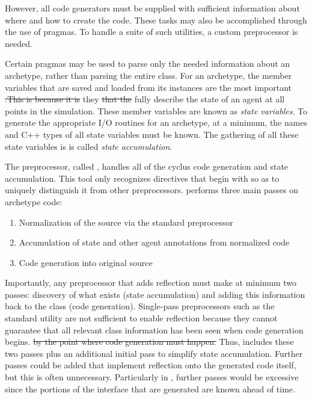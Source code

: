 However, all code generators must be supplied with sufficient information about
where and how to create the code. These tasks may also be accomplished through 
the use of pragmas. To handle a suite of such utilities, a custom preprocessor
is needed.

Certain pragmas may be used to parse only the needed information 
about an archetype, rather than parsing the entire class. For an archetype, the 
member variables that are saved and loaded from its instances are the most important \sout{.This is because it is}  they \sout{that the} fully describe the state of an agent 
at all points in the simulation. These member variables are known as \emph{state variables}. 
To generate the appropriate I/O routines for an archetype, at a minimum, the names and C++ types 
of all state variables must be known. The gathering  of all these state variables is is 
called \emph{state accumulation}. 


The \cyclus preprocessor, called \cycpp, handles all of the cyclus code generation
and state accumulation. This tool only recognizes directives that begin with  so as to uniquely distinguish it from other preprocessors.
\cycpp performs three main passes on archetype code:
\begin{enumerate}
    \item Normalization of the source via the standard preprocessor  
    \item Accumulation of state and other agent annotations from normalized code 
    \item Code generation into original source
\end{enumerate}
Importantly, any preprocessor that adds reflection must make at
minimum two passes: discovery of what exists (state accumulation) and adding this
information back to the class (code generation). Single-pass preprocessors such 
as the standard  utility are not sufficient to enable reflection because they 
cannot guarantee that all relevant class information has been seen when code generation begins. \sout{by the point 
where code generation must happen.} Thus, \cycpp includes these two passes plus an additional 
initial pass to simplify state accumulation. Further passes could be added that 
implement reflection onto the generated code itself, but this is often unnecessary. 
Particularly in \cyclus, further passes would be excessive since the portions of the 
 interface that are generated are known ahead of time.

